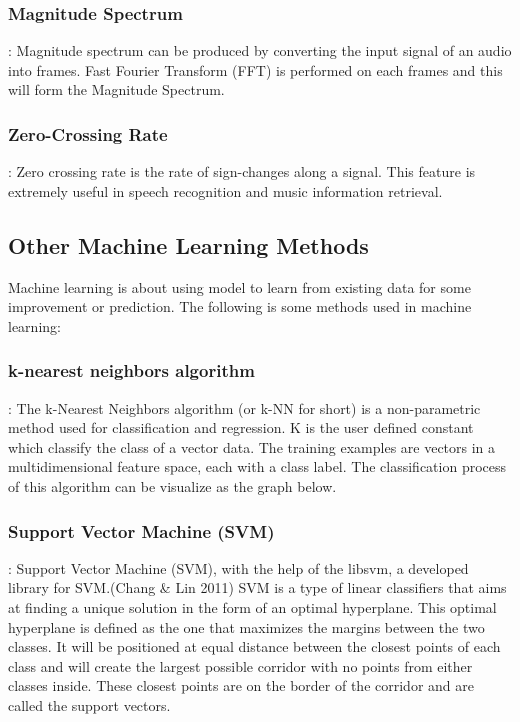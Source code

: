 \documentclass{article}
\begin{document}
	\subsubsection{Magnitude Spectrum}: 
	Magnitude spectrum can be produced by converting the input signal of an audio into frames. 
	Fast Fourier Transform (FFT) is performed on each frames and this will form the Magnitude Spectrum.
	

	\subsubsection{Zero-Crossing Rate}: 
	Zero crossing rate is the rate of sign-changes along a signal. This feature is extremely useful in speech recognition and music information retrieval.

	\subsection{Other Machine Learning Methods}
	Machine learning is about using model to learn from existing data for some improvement or prediction. 
	The following is some methods used in machine learning:

	\subsubsection{k-nearest neighbors algorithm}: 
	The k-Nearest Neighbors algorithm (or k-NN for short) is a non-parametric method used for classification and regression. 
	K is the user defined constant which classify the class of a vector data. The training examples are vectors in a multidimensional feature space, 
	each with a class label. The classification process of this algorithm can be visualize as the graph below.

	\subsubsection{Support Vector Machine (SVM)}: 
	Support Vector Machine (SVM), with the help of the libsvm, a developed library for SVM.(Chang & Lin 2011) 
	SVM is a type of linear classiﬁers that aims at ﬁnding a unique solution in the form of an optimal hyperplane. 
	This optimal hyperplane is deﬁned as the one that maximizes the margins between the two classes. 
	It will be positioned at equal distance between the closest points of each class and will create the largest possible corridor with no points 
	from either classes inside. These closest points are on the border of the corridor and are called the support vectors.
\end{document}
